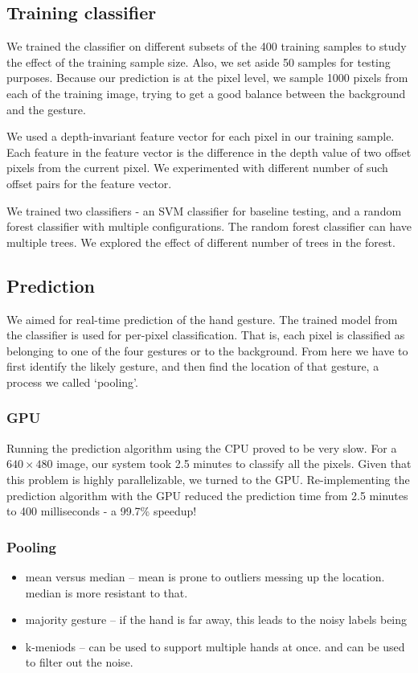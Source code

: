 \documentclass[letterpaper,twocolumn,10pt]{article}
\begin{document}
\subsection{Training classifier}
We trained the classifier on different subsets of the 400 training samples to study the effect of the training sample size. Also, we set aside 50 samples for testing purposes. Because our prediction is at the pixel level, we sample 1000 pixels from each of the training image, trying to get a good balance between the background and the gesture.

We used a depth-invariant feature vector for each pixel in our training sample. Each feature in the feature vector is the difference in the depth value of two offset pixels from the current pixel. We experimented with different number of such offset pairs for the feature vector.

We trained two classifiers - an SVM classifier for baseline testing, and a random forest classifier with multiple configurations. The random forest classifier can have multiple trees. We explored the effect of different number of trees in the forest.

\subsection{Prediction}
We aimed for real-time prediction of the hand gesture. The trained model from the classifier is used for per-pixel classification. That is, each pixel is classified as belonging to one of the four gestures or to the background. From here we have to first identify the likely gesture, and then find the location of that gesture, a process we called `pooling'. 

\subsubsection{GPU} Running the prediction algorithm using the CPU proved to be very slow. For a $640\times480$ image, our system took 2.5 minutes to classify all the pixels. Given that this problem is highly parallelizable, we turned to the GPU. Re-implementing the prediction algorithm with the GPU reduced the prediction time from 2.5 minutes to 400 milliseconds - a 99.7\% speedup!

\subsubsection{Pooling}
\begin{itemize}
\item mean versus median -- mean is prone to outliers messing up the location. median is more resistant to that.
\item majority gesture -- if the hand is far away, this leads to the noisy labels being 
\item k-meniods -- can be used to support multiple hands at once. and can be used to filter out the noise.
\end{itemize}
\end{document}
